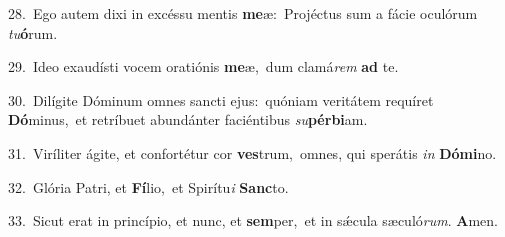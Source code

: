 {\numbfont\textcolor{\numbcolor}{28.}}~Ego autem dixi in excéssu mentis \textbf{me}\-æ:~\star Projéctus sum a fácie oculórum \textit{tu}\-\textbf{ó}rum.\par
{\numbfont\textcolor{\numbcolor}{29.}}~Ideo exaudísti vocem oratiónis \textbf{me}\-æ,~\star dum clamá\textit{rem} \textbf{ad} te.\par
{\numbfont\textcolor{\numbcolor}{30.}}~Dilígite Dóminum omnes sancti ejus:~\dagger quóniam veritátem requíret \textbf{Dó}\-minus,~\star et retríbuet abundánter faciéntibus \textit{su}\-\textbf{pér}\textbf{bi}am.\par
{\numbfont\textcolor{\numbcolor}{31.}}~Viríliter ágite, et confortétur cor \textbf{ves}\-trum,~\star omnes, qui sperátis \textit{in} \textbf{Dó}\-\textbf{mi}no.\par
{\numbfont\textcolor{\numbcolor}{32.}}~Glória Patri, et \textbf{Fí}\-lio,~\star et Spirítu\textit{i} \textbf{Sanc}\-to.\par
{\numbfont\textcolor{\numbcolor}{33.}}~Sicut erat in princípio, et nunc, et \textbf{sem}\-per,~\star et in sǽcula sæculó\-\textit{rum}\-. \textbf{A}\-men.\par
